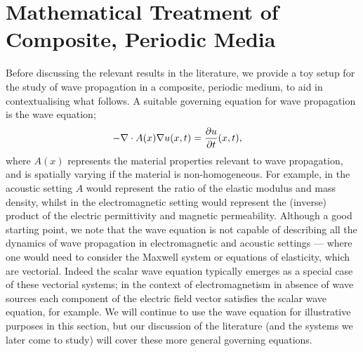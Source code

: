 \section{Mathematical Treatment of Composite, Periodic Media} \label{sec:MathHomLR}

Before discussing the relevant results in the literature, we provide a toy setup for the study of wave propagation in a composite, periodic medium, to aid in contextualising what follows.
A suitable governing equation for wave propagation is the wave equation;
\begin{align*}
	-\nabla\cdot A(x)\nabla u(x,t) &= \dfrac{\partial u}{\partial t}(x,t),
\end{align*}
where $A(x)$ represents the material properties relevant to wave propagation, and is spatially varying if the material is non-homogeneous.
For example, in the acoustic setting $A$ would represent the ratio of the elastic modulus and mass density, whilst in the electromagnetic setting would represent the (inverse) product of the electric permittivity and magnetic permeability.
Although a good starting point, we note that the wave equation is not capable of describing all the dynamics of wave propagation in electromagnetic and acoustic settings --- where one would need to consider the Maxwell system or equations of elasticity, which are vectorial.
Indeed the scalar wave equation typically emerges as a special case of these vectorial systems; in the context of electromagnetism in absence of wave sources each component of the electric field vector satisfies the scalar wave equation, for example.
We will continue to use the wave equation for illustrative purposes in this section, but our discussion of the literature (and the systems we later come to study) will cover these more general governing equations.

